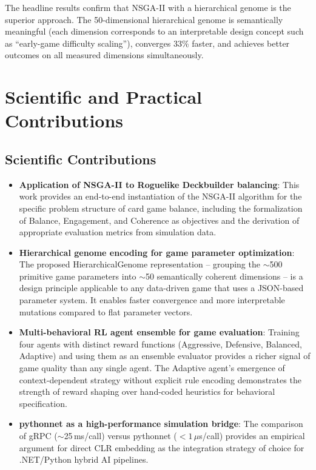 The headline results confirm that NSGA-II with a hierarchical genome is the superior approach. The 50-dimensional hierarchical genome is semantically meaningful (each dimension corresponds to an interpretable design concept such as ``early-game difficulty scaling''), converges 33\% faster, and achieves better outcomes on all measured dimensions simultaneously.

\section{Scientific and Practical Contributions}

\subsection{Scientific Contributions}

\begin{itemize}
    \item \textbf{Application of NSGA-II to Roguelike Deckbuilder balancing}: This work provides an end-to-end instantiation of the NSGA-II algorithm for the specific problem structure of card game balance, including the formalization of Balance, Engagement, and Coherence as objectives and the derivation of appropriate evaluation metrics from simulation data.

    \item \textbf{Hierarchical genome encoding for game parameter optimization}: The proposed HierarchicalGenome representation -- grouping the $\sim$500 primitive game parameters into $\sim$50 semantically coherent dimensions -- is a design principle applicable to any data-driven game that uses a JSON-based parameter system. It enables faster convergence and more interpretable mutations compared to flat parameter vectors.

    \item \textbf{Multi-behavioral RL agent ensemble for game evaluation}: Training four agents with distinct reward functions (Aggressive, Defensive, Balanced, Adaptive) and using them as an ensemble evaluator provides a richer signal of game quality than any single agent. The Adaptive agent's emergence of context-dependent strategy without explicit rule encoding demonstrates the strength of reward shaping over hand-coded heuristics for behavioral specification.

    \item \textbf{pythonnet as a high-performance simulation bridge}: The comparison of gRPC ($\sim$25\,ms/call) versus pythonnet ($<1\,\mu$s/call) provides an empirical argument for direct CLR embedding as the integration strategy of choice for .NET/Python hybrid AI pipelines.
\end{itemize}

